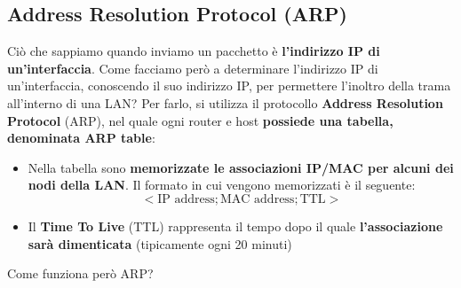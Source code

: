 \documentclass[12pt]{article}
\begin{document}
\subsection{Address Resolution Protocol (ARP)}
Ciò che sappiamo quando inviamo un pacchetto è \textbf{l'indirizzo IP di un'interfaccia}. Come facciamo però a determinare l'indirizzo IP di un'interfaccia, conoscendo il suo indirizzo IP, per permettere l'inoltro della trama all'interno di una LAN?
Per farlo, si utilizza il protocollo \textbf{Address Resolution Protocol} (ARP), nel quale ogni router e host \textbf{possiede una tabella, denominata ARP table}:
\begin{itemize}
    \item Nella tabella sono \textbf{memorizzate le associazioni IP/MAC per alcuni dei nodi della LAN}. Il formato in cui vengono memorizzati è il seguente:
    $$<\textrm{IP address}; \textrm{MAC address}; \textrm{TTL}>$$
    \item Il \textbf{Time To Live} (TTL) rappresenta il tempo dopo il quale \textbf{l'associazione sarà dimenticata} (tipicamente ogni 20 minuti)
\end{itemize}
Come funziona però ARP?
\end{document}
